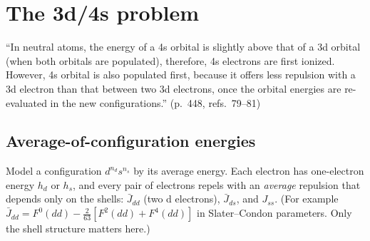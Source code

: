 \section{The 3d/4s problem}\label{sec:3d4s}

\begin{reviewclaim}
``In neutral atoms, the energy of a 4s orbital is slightly above that of a 3d orbital (when both orbitals
are populated), therefore, 4s electrons are first ionized. However, 4s orbital is also populated first,
because it offers less repulsion with a 3d electron than that between two 3d electrons, once the orbital
energies are re-evaluated in the new configurations.'' (p.~448, refs.~79--81)
\end{reviewclaim}

\subsection{Average-of-configuration energies}
Model a configuration $d^{n_d}s^{n_s}$ by its average energy. Each electron has one-electron energy $h_d$ or $h_s$,
and every pair of electrons repels with an \emph{average} repulsion that depends only on the shells:
$\bar J_{dd}$ (two d electrons), $\bar J_{ds}$, and $J_{ss}$. (For example $\bar J_{dd}=F^0(dd)-\tfrac{2}{63}[F^2(dd)+F^4(dd)]$
in Slater--Condon parameters. Only the shell structure matters here.)

